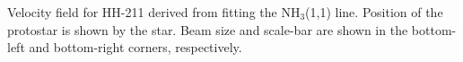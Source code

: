 Velocity field for HH-211 derived from fitting the NH$_3$(1,1) line. 
Position of the protostar is shown by the star. 
Beam size and scale-bar are shown in the bottom-left and bottom-right corners, respectively.